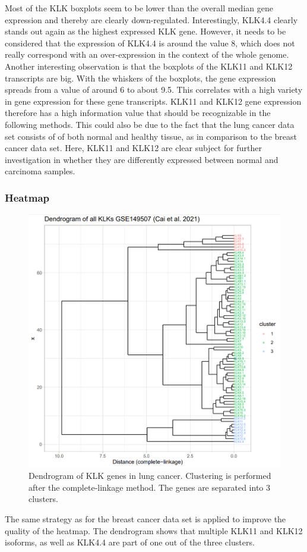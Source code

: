 \documentclass[
]{article}
\begin{document}
Most of the KLK boxplots seem to be lower than the overall median gene
expression and thereby are clearly down-regulated. Interestingly, KLK4.4
clearly stands out again as the highest expressed KLK gene. However, it
needs to be considered that the expression of KLK4.4 is around the value
8, which does not really correspond with an over-expression in the
context of the whole genome. Another interesting observation is that the
boxplots of the KLK11 and KLK12 transcripts are big. With the whiskers
of the boxplots, the gene expression spreads from a value of around 6 to
about 9.5. This correlates with a high variety in gene expression for
these gene transcripts. KLK11 and KLK12 gene expression therefore has a
high information value that should be recognizable in the following
methods. This could also be due to the fact that the lung cancer data
set consists of of both normal and healthy tissue, as in comparison to
the breast cancer data set. Here, KLK11 and KLK12 are clear subject for
further investigation in whether they are differently expressed between
normal and carcinoma samples.

\hypertarget{heatmap-1}{%
\subsubsection{Heatmap}\label{heatmap-1}}

\begin{figure}

{\centering \includegraphics[width=0.5\linewidth]{images/Dendrogram_lung} 

}

\caption{Dendrogram of KLK genes in lung cancer. Clustering is performed after the complete-linkage method. The genes are separated into 3 clusters.}\label{fig:Dendrogram - lung }
\end{figure}

The same strategy as for the breast cancer data set is applied to
improve the quality of the heatmap. The dendrogram shows that multiple
KLK11 and KLK12 isoforms, as well as KLK4.4 are part of one out of the
three clusters.
\end{document}
